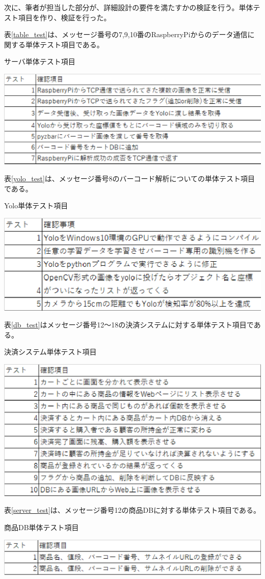 \newpage

次に、筆者が担当した部分が、詳細設計の要件を満たすかの検証を行う。単体テスト項目を作り、検証を行った。

表\ref{table_test}は、メッセージ番号の7,9,10番のRaspberryPiからのデータ通信に関する単体テスト項目である。
\begin{table}[htbp]
\centering
\caption{サーバ単体テスト項目}
\includegraphics[width=15cm]{./pic/server_test.eps}
\label{server_test}
\end{table}

表\ref{yolo_test}は、メッセージ番号8のバーコード解析についての単体テスト項目である。
\begin{table}[htbp]
\centering
\caption{Yolo単体テスト項目}
\includegraphics[width=15cm]{./pic/yolo_test.eps}
\label{yolo_test}
\end{table}

\newpage

表\ref{db_test}はメッセージ番号12～18の決済システムに対する単体テスト項目である。
\begin{table}[htbp]
\centering
\caption{決済システム単体テスト項目}
\includegraphics[width=15cm]{./pic/db_test.eps}
\label{db_test}
\end{table}

表\ref{server_test}は、メッセージ番号12の商品DBに対する単体テスト項目である。
\begin{table}[htbp]
\centering
\caption{商品DB単体テスト項目}
\includegraphics[width=15cm]{./pic/table_test.eps}
\label{table_test}
\end{table}
